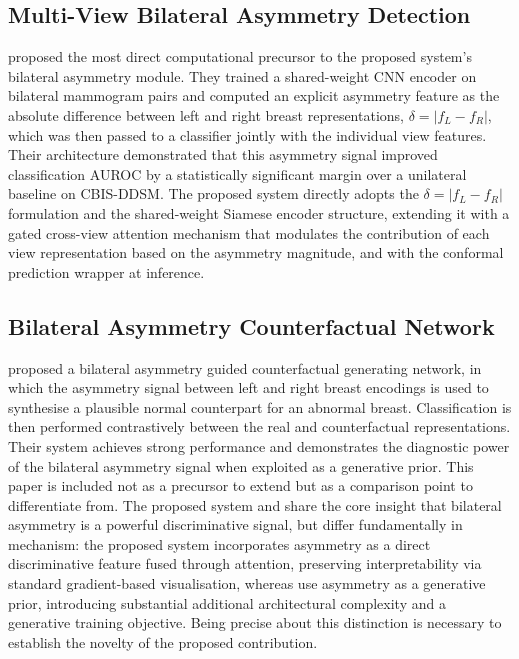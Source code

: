 \documentclass[12pt, a4paper]{article}
\begin{document}
\subsection{Multi-View Bilateral Asymmetry Detection}

\textcite{Nguyen2019} proposed the most direct computational precursor to the
proposed system's bilateral asymmetry module.
They trained a shared-weight CNN encoder on bilateral mammogram pairs and
computed an explicit asymmetry feature as the absolute difference between
left and right breast representations, $\delta = |f_L - f_R|$, which was
then passed to a classifier jointly with the individual view features.
Their architecture demonstrated that this asymmetry signal improved
classification AUROC by a statistically significant margin over a unilateral
baseline on CBIS-DDSM.
The proposed system directly adopts the $\delta = |f_L - f_R|$
formulation and the shared-weight Siamese encoder structure, extending it
with a gated cross-view attention mechanism that modulates the contribution
of each view representation based on the asymmetry magnitude, and with
the conformal prediction wrapper at inference.

\subsection{Bilateral Asymmetry Counterfactual Network}

\textcite{Yang2021} proposed a bilateral asymmetry guided counterfactual
generating network, in which the asymmetry signal between left and right
breast encodings is used to synthesise a plausible normal counterpart for
an abnormal breast.
Classification is then performed contrastively between the real and
counterfactual representations.
Their system achieves strong performance and demonstrates the diagnostic power
of the bilateral asymmetry signal when exploited as a generative prior.
This paper is included not as a precursor to extend but as a comparison point
to differentiate from.
The proposed system and \textcite{Yang2021} share the core insight that
bilateral asymmetry is a powerful discriminative signal, but differ
fundamentally in mechanism: the proposed system incorporates asymmetry
as a direct discriminative feature fused through attention, preserving
interpretability via standard gradient-based visualisation, whereas
\textcite{Yang2021} use asymmetry as a generative prior, introducing
substantial additional architectural complexity and a generative training
objective.
Being precise about this distinction is necessary to establish the
novelty of the proposed contribution.
\end{document}
